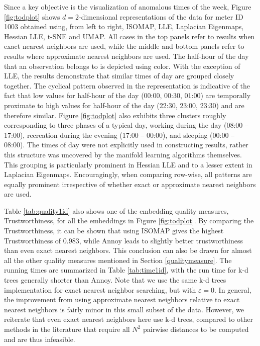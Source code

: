 \documentclass[11pt,a4paper,]{article}
\begin{document}
Since a key objective is the visualization of anomalous times of the week, Figure \ref{fig:todplot} shows \(d=2\)-dimensional representations of the data for meter ID 1003 obtained using, from left to right, ISOMAP, LLE, Laplacian Eigenmaps, Hessian LLE, t-SNE and UMAP. All cases in the top panels refer to results when exact nearest neighbors are used, while the middle and bottom panels refer to results where approximate nearest neighbors are used. The half-hour of the day that an observation belongs to is depicted using color. With the exception of LLE, the results demonstrate that similar times of day are grouped closely together. The cyclical pattern observed in the representation is indicative of the fact that low values for half-hour of the day (00:00, 00:30, 01:00) are temporally proximate to high values for half-hour of the day (22:30, 23:00, 23:30) and are therefore similar. Figure \ref{fig:todplot} also exhibits three clusters roughly corresponding to three phases of a typical day, working during the day (08:00 -- 17:00), recreation during the evening (17:00 -- 00:00), and sleeping (00:00 -- 08:00). The times of day were not explicitly used in constructing results, rather this structure was uncovered by the manifold learning algorithms themselves. This grouping is particularly prominent in Hessian LLE and to a lesser extent in Laplacian Eigenmaps. Encouragingly, when comparing row-wise, all patterns are equally prominent irrespective of whether exact or approximate nearest neighbors are used.

Table \ref{tab:quality1id} also shows one of the embedding quality measures, Trustworthiness, for all the embeddings in Figure \ref{fig:todplot}. By comparing the Trustworthiness, it can be shown that using ISOMAP gives the highest Trustworthiness of 0.983, while Annoy leads to slightly better trustworthiness than even exact nearest neighbors. This conclusion can also be drawn for almost all the other quality measures mentioned in Section \ref{qualitymeasure}. The running times are summarized in Table \ref{tab:time1id}, with the run time for k-d trees generally shorter than Annoy. Note that we use the same k-d trees implementation for exact nearest neighbor searching, but with \(\varepsilon=0\). In general, the improvement from using approximate nearest neighbors relative to exact nearest neighbors is fairly minor in this small subset of the data. However, we reiterate that even exact nearest neighbors here use k-d trees, compared to other methods in the literature that require all \(N^2\) pairwise distances to be computed and are thus infeasible.
\end{document}
